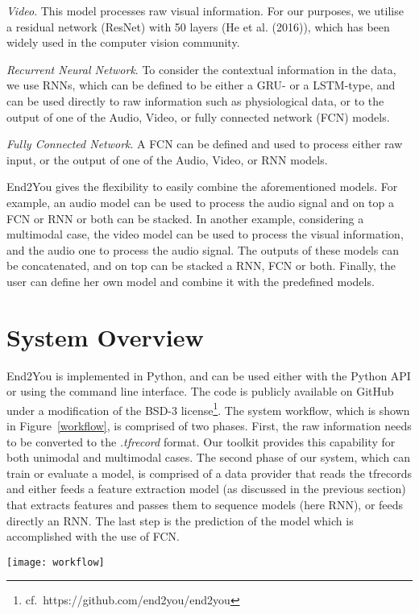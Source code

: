 \documentclass[twoside,11pt]{article}
\begin{document}
\textit{Video}. This model processes raw visual information. For our purposes, we utilise a residual network (ResNet) with 50 layers (He et al. (2016)), which has been widely used in the computer vision community.

\textit{Recurrent Neural Network}. To consider the contextual information in the data, we use RNNs, which can be defined to be either a GRU- or a LSTM-type, and can be used directly to raw information such as physiological data, or to the output of one of the Audio, Video, or fully connected network (FCN) models.

\textit{Fully Connected Network}. A FCN can be defined and used to process either raw input, or the output of one of the Audio, Video, or RNN models.

End2You gives the flexibility to easily combine the aforementioned models. For example, an audio model can be used to process the audio signal and on top a FCN or RNN or both can be stacked. In another example, considering a multimodal case, the video model can be used to process the visual information, and the audio one to process the audio signal. The outputs of these models can be concatenated, and on top can be stacked a RNN, FCN or both. Finally, the user can define her own model and combine it with the predefined models.

\section{System Overview}

End2You is implemented in Python, and can be used either with the Python API or using the command line interface. The code is publicly available on GitHub under a modification of the BSD-3 license\footnote{cf.\ https://github.com/end2you/end2you}. The system workflow, which is shown in Figure~\ref{workflow}, is comprised of two phases. 
First, the raw information needs to be converted to the \textit{.tfrecord} format. Our toolkit provides this capability for both unimodal and multimodal cases. The second phase of our system, which can train or evaluate  a model, is comprised of a data provider that reads the tfrecords and either feeds a feature extraction model (as discussed in the previous section) that extracts features and passes them to sequence models (here RNN), or feeds directly an RNN. The last step is the prediction of the model which is accomplished with the use of FCN. 

\begin{figure*}[h]
\centering
\texttt{[image: workflow]}
\caption{The End2You workflow is comprised of the tfrecord generator, the data provider that feeds the either static or dynamic data to the models, and finally, the prediction.}
\label{workflow}
\end{figure*}
\end{document}
